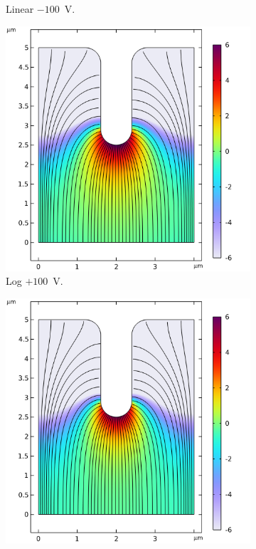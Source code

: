 \begin{refsection}
\begin{figure}[H]
\begin{subfigure}[b]{0.45\linewidth}
        \caption{Linear $-100$~\si{\volt}.}
        \label{fig:c_-100_lin_j_gm}
    \end{subfigure}
    
    \begin{subfigure}[b]{0.45\linewidth}
        \includegraphics[width=\linewidth]{Chapter7/Figs/Raster/Comsol/+100_logJ_GM_smol.png}
        \caption{Log $+100$~\si{\volt}.}
        \label{fig:c_+100_log_j_gm}
    \end{subfigure}
    \hfill %
    \begin{subfigure}[b]{0.45\linewidth}
        \includegraphics[width=\linewidth]{Chapter7/Figs/Raster/Comsol/-100_logJ_GM_smol.png}

\end{subfigure}
\end{figure}
\end{refsection}
